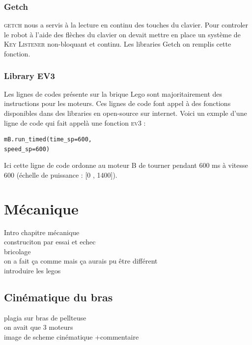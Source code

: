 \documentclass[twoside,twocolumn, 16pt]{article}
\begin{document}
\subsubsection{Getch}
\textsc{getch} nous a servis à la lecture en continu des touches du clavier. Pour controler le robot à l'aide des flèches du clavier on devait mettre en place un système de \textsc{Key Listener} non-bloquant et continu. Les libraries Getch on remplis cette fonction.

\subsubsection{Library EV3}
Les lignes de codes présente sur la brique Lego sont majoritairement des instructions pour les moteurs. Ces lignes de code font appel à des fonctions disponibles dans des libraries en open-source sur internet. Voici un exmple d'une ligne de code qui fait appelà une fonction \textsc{ev3} : \\
\vspace{-0.5cm}
\begin{lstlisting}
mB.run_timed(time_sp=600, 
speed_sp=600)
\end{lstlisting}
Ici cette ligne de code ordonne au moteur B de tourner pendant 600 ms à vitesse 600 (échelle de puissance : [0 , 1400]).


\section{Mécanique}

Intro chapitre mécanique \\
construciton par essai et echec \\
bricolage \\
on a fait ça comme mais ça aurais pu être différent \\
introduire les legos 

\subsection{Cinématique du bras}
plagia sur bras de pellteuse \\
on avait que 3 moteurs \\
image de scheme cinématique +commentaire \\
\end{document}

